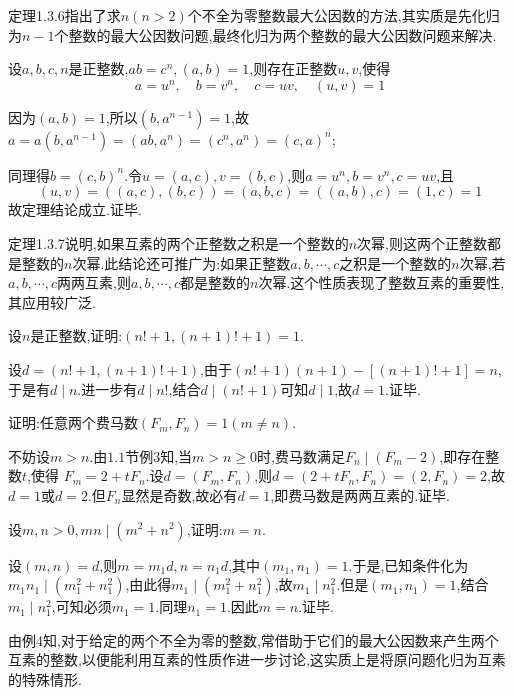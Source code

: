 \remark 定理1.3.6指出了求$n(n>2)$个不全为零整数最大公因数的方法,其实质是先化归为$n-1$个整数的最大公因数问题,最终化归为两个整数的最大公因数问题来解决.

\theorem {\color{red}[定理1.3.7]}设$a, b, c, n$是正整数,$a b=c^{n},(a, b)=1$,则存在正整数$u, v$,使得
\begin{equation*}
	a=u^{n}, \quad b=v^{n}, \quad c=u v, \quad(u, v)=1
\end{equation*}

\proof 因为$(a, b)=1$,所以$\left(b, a^{n-1}\right)=1$,故$a=a\left(b, a^{n-1}\right)=\left(a b, a^{n}\right)=\left(c^{n}, a^{n}\right)=(c, a)^{n}$;

同理得$b=(c, b)^{n}$.令$u=(a, c), v=(b, c)$,则$a=u^{n}, b=v^{n}, c=u v$,且
\begin{equation*}
	(u, v)=((a, c),(b, c))=(a, b, c)=((a, b), c)=(1, c)=1
\end{equation*}
故定理结论成立.证毕.

\remark 定理1.3.7说明,如果互素的两个正整数之积是一个整数的$n$次幂,则这两个正整数都是整数的$n$次幂.此结论还可推广为:如果正整数$a, b, \cdots, c$之积是一个整数的$n$次幂,若$a, b, \cdots, c$两两互素,则$a, b, \cdots, c$都是整数的$n$次幂.这个性质表现了整数互素的重要性,其应用较广泛.

\example 设$n$是正整数,证明:$(n !+1,(n+1) !+1)=1$.

\proof 设$d=(n !+1,(n+1) !+1)$,由于$(n !+1)(n+1)-[(n+1) !+1]=n$,于是有$d \mid n$.进一步有$d \mid n !$,结合$d \mid(n !+1)$可知$d \mid 1$,故$d=1$.证毕.

\example 证明:任意两个费马数$\left(F_{m}, F_{n}\right)=1(m \neq n)$.

\proof 不妨设$m>n$.由$1.1$节例3知,当$m>n \geqslant 0$时,费马数满足$F_{n} \mid\left(F_{m}-2\right)$,即存在整数$t$,使得 $F_{m}=2+t F_{n}$.设$d=\left(F_{m}, F_{n}\right)$,则$d=\left(2+t F_{n}, F_{n}\right)=\left(2, F_{n}\right)=2$,故$d=1$或$d=2$.但$F_{n}$显然是奇数,故必有$d=1$,即费马数是两两互素的.证毕.

\example 设$m, n>0, m n \mid\left(m^{2}+n^{2}\right)$,证明:$m=n$.

\proof 设$(m, n)=d$,则$m=m_{1} d, n=n_{1} d$,其中$\left(m_{1}, n_{1}\right)=1$.于是,已知条件化为$m_{1} n_{1} \mid\left(m_{1}^{2}+n_{1}^{2}\right)$,由此得$m_{1} \mid\left(m_{1}^{2}+n_{1}^{2}\right)$,故$m_{1} \mid n_{1}^{2}$.但是$\left(m_{1}, n_{1}\right)=1$,结合$m_{1} \mid n_{1}^{2}$,可知必须$m_{1}=1$.同理$n_{1}=1$.因此$m=n$.证毕.

\remark 由例4知,对于给定的两个不全为零的整数,常借助于它们的最大公因数来产生两个互素的整数,以便能利用互素的性质作进一步讨论,这实质上是将原问题化归为互素的特殊情形.

